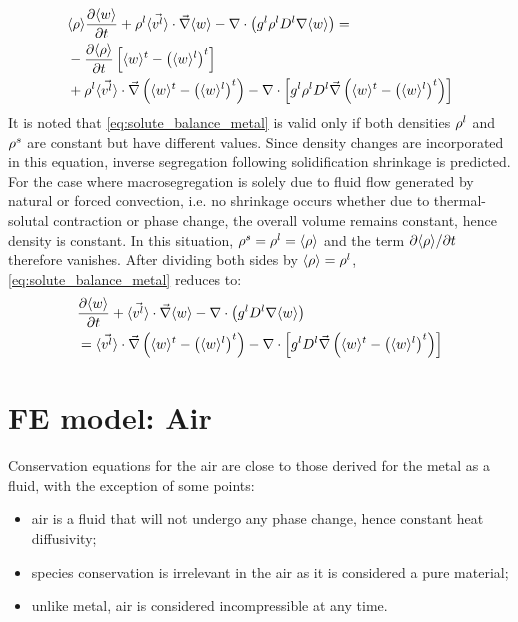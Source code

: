 \begin{align}
\label{eq:solute_balance_metal}
\begin{split}
 & \langle \rho \rangle \frac{\partial \langle w \rangle}{\partial t}   + \rho^l  \langle \vec{v^l} \rangle \cdot \vec{\nabla} \langle w \rangle - \nabla \cdot \left( {g^l} \rho^l D^l \nabla \langle w \rangle \right)=\\
 &	 - \frac{\partial \langle \rho \rangle}{\partial t}  \left[ \langle w \rangle^t - \left( \langle w \rangle^l \right)^t \right] \\ 
 &	 + \rho^l \langle \vec{v^l} \rangle \cdot \vec{\nabla} \left( \langle w \rangle^t -\left( \langle w \rangle^l \right)^t \right)
 	 - \nabla \cdot \left[ {g^l} \rho^l D^l  \vec{\nabla} \left( \langle w \rangle^t -\left( \langle w \rangle^l \right)^t \right)  \right]
  \end{split}
  \end{align}
It is noted that \cref{eq:solute_balance_metal} is valid only if both densities $\rho^l$ and $\rho^s$
are constant but have different values. Since density changes are incorporated in this equation, 
inverse segregation following solidification shrinkage is predicted.
For the case where macrosegregation is solely due to fluid flow generated by natural or forced convection, i.e. no shrinkage occurs whether due to thermal-solutal contraction or phase change, 
the overall volume remains constant, hence density is constant. In this situation, $\rho^s=\rho^l=\langle \rho \rangle$ and the term $\partial \langle \rho \rangle/\partial t$ therefore vanishes.
After dividing both sides by $\langle \rho \rangle=\rho^l$, \cref{eq:solute_balance_metal} reduces to:
\begin{align}
\label{eq:solute_balance_metal_incompressible}
 \begin{split}
      & \frac{\partial \langle w \rangle}{\partial t}   + \langle \vec{v^l} \rangle \cdot \vec{\nabla} \langle w \rangle - \nabla \cdot \left( {g^l} D^l \nabla \langle w \rangle \right) \\
	  & = \langle \vec{v^l} \rangle \cdot \vec{\nabla} \left( \langle w \rangle^t -\left( \langle w \rangle^l \right)^t \right)
	 - \nabla \cdot \left[ {g^l} D^l \vec{\nabla} \left( \langle w \rangle^t -\left( \langle w \rangle^l \right)^t \right)  \right] 
  \end{split}
\end{align}
%
\section{FE model: Air}
Conservation equations for the air are close to those derived for the metal as a fluid, with the exception
of some points:
\begin{itemize}
\itemsep0em
\item air is a fluid that will not undergo any phase change, hence constant heat diffusivity;
\item species conservation is irrelevant in the air as it is considered a pure material;
\item unlike metal, air is considered incompressible at any time.
\end{itemize}

